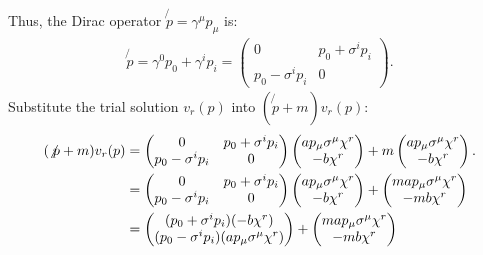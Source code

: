 \begin{enumerate}
    Thus, the Dirac operator $\not{p} = \gamma^\mu p_\mu$ is:
    \begin{align*}
        \not{p} = \gamma^0 p_0 + \gamma^i p_i = 
        \begin{pmatrix}
        0 & p_0 + \sigma^i p_i \\
        p_0 - \sigma^i p_i & 0
        \end{pmatrix}.
    \end{align*}
    Substitute the trial solution $v_r(p)$ into $(\not{p} + m)v_r(p)$:
    \begin{align}
        (\not{p} + m) v_r(p) &= 
        \begin{pmatrix}
        0 & p_0 + \sigma^i p_i \\
        p_0 - \sigma^i p_i & 0
        \end{pmatrix}
        \begin{pmatrix}
        a p_\mu \sigma^\mu \chi^r \\
        -b \chi^r
        \end{pmatrix}
        + m
        \begin{pmatrix}
        a p_\mu \sigma^\mu \chi^r \\
        -b \chi^r
        \end{pmatrix}.\notag\\
        &=
        \begin{pmatrix}
        0 & p_0 + \sigma^i p_i \\
        p_0 - \sigma^i p_i & 0
        \end{pmatrix}
        \begin{pmatrix}
        a p_\mu \sigma^\mu \chi^r \\
        -b \chi^r
        \end{pmatrix}
        +
        \begin{pmatrix}
        m a p_\mu \sigma^\mu \chi^r \\
        -m b \chi^r
        \end{pmatrix}\notag\\
        &=\begin{pmatrix}
        (p_0 + \sigma^i p_i)(-b \chi^r) \\
        (p_0 - \sigma^i p_i)(a p_\mu \sigma^\mu \chi^r)
        \end{pmatrix}+
        \begin{pmatrix}
        m a p_\mu \sigma^\mu \chi^r \\
        -m b \chi^r
        \end{pmatrix}\notag\\

\end{align}
\end{enumerate}
